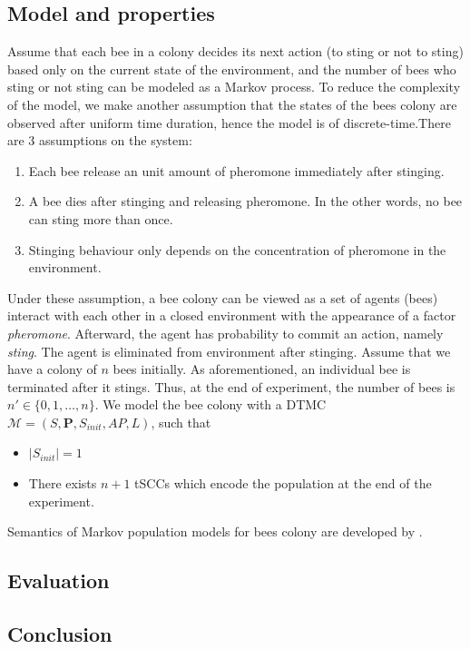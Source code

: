 \subsection{Model and properties}
Assume that each bee in a colony decides its next action (to sting or not to sting) based only on
the current state of the environment, and the number of bees who sting or not sting can be modeled
as a Markov process. To reduce the complexity of the model, we make another assumption that the
states of the bees colony are observed after uniform time duration, hence the model is of
discrete-time.There are 3 assumptions on the system:
\begin{enumerate}
    \item Each bee release an unit amount of pheromone immediately after stinging.
    \item A bee dies after stinging and releasing pheromone. In the other words, no bee can sting
          more than once.
    \item Stinging behaviour only depends on the concentration of pheromone in the environment.
\end{enumerate}
Under these assumption, a bee colony can be viewed as a set of agents (bees) interact with each
other in a closed environment with the appearance of a factor \textit{pheromone}. Afterward, the
agent has probability to commit an action, namely \textit{sting}. The agent is eliminated from
environment after stinging. Assume that we have a colony of $n$ bees initially. As aforementioned,
an individual bee is terminated after it stings. Thus, at the end of experiment, the number of bees
is $n'\in\{0,1,\ldots,n\}$. We model the bee colony with a DTMC $\mathcal{M}=(S,\mathbf{P},
    S_{init}, AP,L)$, such that
\begin{itemize}
    \item $|S_{init}|=1$
    \item There exists $n+1$ tSCCs which encode the population at the end of the experiment.
\end{itemize}
Semantics of Markov population models for bees colony are developed by \cite{hajnal2019data}.
\subsection{Evaluation}
\subsection{Conclusion}

